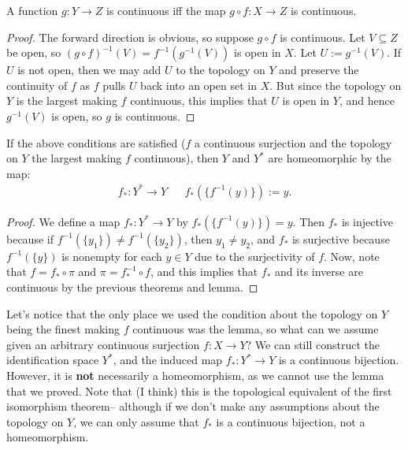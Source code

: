 	\begin{lemma}
		A function $g : Y\rightarrow Z$ is continuous iff the map $g\circ f : X\rightarrow Z$ is continuous.
	\end{lemma}
	
	\begin{proof}
		The forward direction is obvious, so suppose $g\circ f$ is continuous. Let $V\subseteq Z$ be open, so $(g\circ f)^{-1}(V) = f^{-1}(g^{-1}(V))$ is open 
		in $X$. Let $U := g^{-1}(V)$. If $U$ is not open, then we may add $U$ to the topology on $Y$ and preserve the continuity of $f$ as $f$ pulls $U$ 
		back into an open set in $X$. But since the topology on $Y$ is the largest making $f$ continuous, this implies that $U$ is open in $Y$, and hence 
		$g^{-1}(V)$ is open, so $g$ is continuous.
	\end{proof}
	
	\begin{theorem}
		If the above conditions are satisfied ($f$ a continuous surjection and the topology on $Y$ the largest making $f$ continuous), then $Y$ and $Y^*$ 
		are homeomorphic by the map:
		\begin{align}
			f_* : Y^*\rightarrow Y && f_*(\{f^{-1}(y)\}) := y.
		\end{align}
	\end{theorem}
	
	\begin{proof}
		We define a map $f_* : Y^*\rightarrow Y$ by $f_*(\{f^{-1}(y)\}) = y$. Then $f_*$ is injective because if $f^{-1}(\{y_1\})\neq f^{-1}(\{y_2\})$, then $y_1\neq 
		y_2$, and $f_*$ is surjective because $f^{-1}(\{y\})$ is nonempty for each $y\in Y$ due to the surjectivity of $f$. Now, note that $f = f_*\circ\pi$ and 
		$\pi = f_*^{-1}\circ f$, and this implies that $f_*$ and its inverse are continuous by the previous theorems and lemma.
	\end{proof}
	
	Let's notice that the only place we used the condition about the topology on $Y$ being the finest making $f$ continuous was the lemma, so what can we 
	assume given an arbitrary continuous surjection $f : X\rightarrow Y$? We can still construct the identification space $Y^*$, and the induced map $f_* : Y^*
	\rightarrow Y$ is a continuous bijection. However, it is \textbf{not} necessarily a homeomorphism, as we cannot use the lemma that we proved. Note 
	that (I think) this is the topological equivalent of the first isomorphism theorem-- although if we don't make any assumptions about the topology on $Y$, 
	we can only assume that $f_*$ is a continuous bijection, not a homeomorphism.
	
